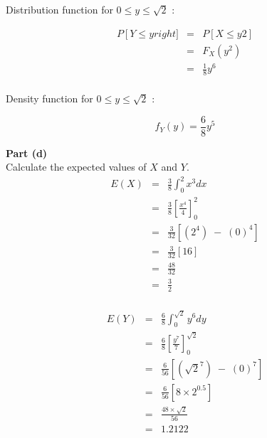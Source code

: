 \documentclass[a4paper,12pt]{article}
\begin{document}
Distribution function for $0 \leq y \leq \sqrt{2}$ :

\begin{eqnarray*}
P \left[ Y \leq y right] 
&=& P \left[ X \leq y 2 \right] \\ 
&=& F_X(y^2) \\ 
&=& \frac{1}{8} y^6 \\
\end{eqnarray*}

Density function for $0 \leq y \leq \sqrt{2}$ :


\[f_Y ( y ) = \frac{6}{8} y^5 \]

\medskip
\noindent \textbf{Part (d)}\\

\noindent Calculate the expected values of $X$ and $Y$. 
\begin{eqnarray*}
E(X) &=& \frac{3}{8} \int^{2}_{0} x^3 dx \\
&=& \frac{3}{8} \left[ \frac{x^4}{4} \right]^{2}_{0} \\
&=& \frac{3}{32 } \left[(2^4) \;-\; (0)^4 \right] \\
&=& \frac{3}{32 } \left[ 16 \right] \\
&=& \frac{48}{32}\\
&=& \frac{3}{2}\\
\end{eqnarray*}

\begin{eqnarray*}
E(Y) &=& \frac{6}{8} \int^{\sqrt{2} }_{0} y^6 dy \\
&=& \frac{6}{8} \left[ \frac{y^7}{7} \right]^{\sqrt{2} }_{0} \\
&=& \frac{6}{56 } \left[( \sqrt{2}^7) \;-\; (0)^7 \right] \\
&=& \frac{6}{56 } \left[ 8 \times 2^{0.5} \right] \\
&=& \frac{48 \times \sqrt{2} }{56}\\
&=& 1.2122\\
\end{eqnarray*}

 
\end{document}
